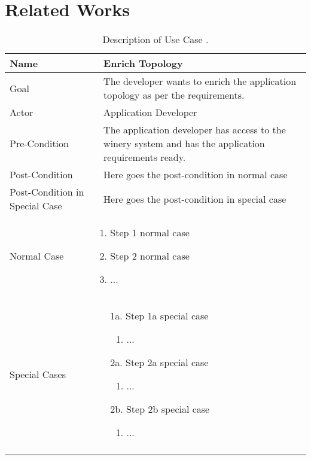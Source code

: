 \chapter{Related Works} \label{chap:relatedworks}

\newcommand{\usecase}[8]
{
{
\small \begin{longtable}{@{}p{.2\textwidth}p{.01\textwidth}p{.79\textwidth}@{}}
\toprule Name & & \textbf{#1} \\
\midrule Goal & & #2 \\
\midrule Actor & & #3 \\
\midrule Pre-Condition & & #4 \\
\midrule Post-Condition & & #5 \\
\midrule Post-Condition in Special Case & & #6 \\
\midrule Normal Case & \multicolumn{2}{p{.8\textwidth}}{\vspace*{-0.5cm}#7} \\
\midrule Special Cases &  \multicolumn{2}{p{.8\textwidth}}{\vspace*{-0.5cm}#8} \\
\bottomrule
\caption[Description of Use Case: #1]{Description of Use Case \term{#1}.}
\end{longtable}
}
\label{table:#1}
\clearpage
}


\usecase{Enrich Topology}
{The developer wants to enrich the application topology as per the requirements.}
{Application Developer}
{The application developer has access to the winery system and has the application requirements ready.}
{Here goes the post-condition in normal case}
{Here goes the post-condition in special case}
{\begin{enumerate}
	\item Step 1 normal case
	\item Step 2 normal case
	\item ...
\end{enumerate}}
{\begin{enumerate}
	\item[1a.] Step 1a special case
		\begin{enumerate}
			\item ...
		\end{enumerate}
	\item[2a.] Step 2a special case
		\begin{enumerate}
			\item ...
		\end{enumerate}
	\item[2b.] Step 2b special case
		\begin{enumerate}
			\item ...
		\end{enumerate}
\end{enumerate}}






